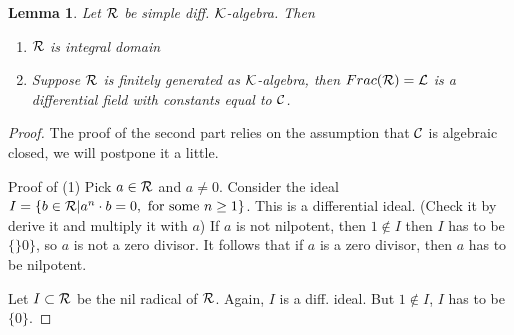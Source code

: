 \documentclass[11pt]{article}
\newtheorem{lemma}[thm]{Lemma}
\newcommand{\calc}{{\cal C}}
\newcommand{\calk}{{\cal K}}
\newcommand{\call}{{\cal L}}
\newcommand{\calr}{{\cal R}}
\begin{document}
\begin{lemma}\label{lem:PV}
Let $\calr$ be simple diff. $\calk$-algebra. Then 
\begin{enumerate}
\item $\calr$  is integral domain
\item Suppose $\calr$ is finitely generated as $\calk$-algebra, then $Frac(\calr)=\call$ is a differential field with constants equal to $\calc$. 
\end{enumerate}
\end{lemma}
\begin{proof}
The proof of the second part relies on the assumption that $\calc$ is algebraic closed, we will postpone it a little.

Proof of (1) Pick $a\in \calr$ and $a\neq0$. Consider the ideal $I=\{b\in \calr|a^n\cdot b=0, \text{ for some $n\geq1$}\}$. This is a differential ideal. (Check it by derive it and multiply it with $a$)
If $a$ is not nilpotent, then $1\not\in I$ then $I$ has to be $\{\}0\}$, so $a$ is not a zero divisor.
It follows that if $a$ is a zero divisor, then $a$ has to be nilpotent.

Let $I\subset \calr$ be the nil radical of $\calr$. Again, $I$ is a diff. ideal. But $1\not \in I$, $I$ has to be $\{0\}$.
\end{proof}
\end{document}
